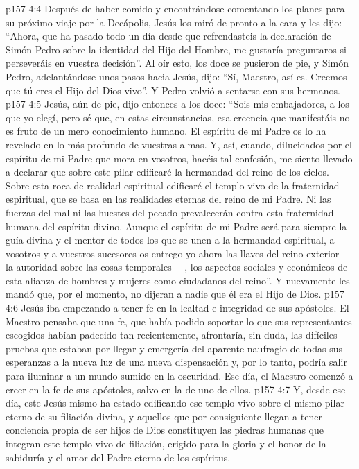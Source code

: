 \vs p157 4:4 Después de haber comido y encontrándose comentando los planes para su próximo viaje por la Decápolis, Jesús los miró de pronto a la cara y les dijo: “Ahora, que ha pasado todo un día desde que refrendasteis la declaración de Simón Pedro sobre la identidad del Hijo del Hombre, me gustaría preguntaros si perseveráis en vuestra decisión”. Al oír esto, los doce se pusieron de pie, y Simón Pedro, adelantándose unos pasos hacia Jesús, dijo: “Sí, Maestro, así es. Creemos que tú eres el Hijo del Dios vivo”. Y Pedro volvió a sentarse con sus hermanos.
\vs p157 4:5 Jesús, aún de pie, dijo entonces a los doce: “Sois mis embajadores, a los que yo elegí, pero sé que, en estas circunstancias, esa creencia que manifestáis no es fruto de un mero conocimiento humano. El espíritu de mi Padre os lo ha revelado en lo más profundo de vuestras almas. Y, así, cuando, dilucidados por el espíritu de mi Padre que mora en vosotros, hacéis tal confesión, me siento llevado a declarar que sobre este pilar edificaré la hermandad del reino de los cielos. Sobre esta roca de realidad espiritual edificaré el templo vivo de la fraternidad espiritual, que se basa en las realidades eternas del reino de mi Padre. Ni las fuerzas del mal ni las huestes del pecado prevalecerán contra esta fraternidad humana del espíritu divino. Aunque el espíritu de mi Padre será para siempre la guía divina y el mentor de todos los que se unen a la hermandad espiritual, a vosotros y a vuestros sucesores os entrego yo ahora las llaves del reino exterior ---la autoridad sobre las cosas temporales ---, los aspectos sociales y económicos de esta alianza de hombres y mujeres como ciudadanos del reino”. Y nuevamente les mandó que, por el momento, no dijeran a nadie que él era el Hijo de Dios.
\vs p157 4:6 \pc Jesús iba empezando a tener fe en la lealtad e integridad de sus apóstoles. El Maestro pensaba que una fe, que había podido soportar lo que sus representantes escogidos habían padecido tan recientemente, afrontaría, sin duda, las difíciles pruebas que estaban por llegar y emergería del aparente naufragio de todas sus esperanzas a la nueva luz de una nueva dispensación y, por lo tanto, podría salir para iluminar a un mundo sumido en la oscuridad. Ese día, el Maestro comenzó a creer en la fe de sus apóstoles, salvo en la de uno de ellos.
\vs p157 4:7 Y, desde ese día, este Jesús mismo ha estado edificando ese templo vivo sobre el mismo pilar eterno de su filiación divina, y aquellos que por consiguiente llegan a tener conciencia propia de ser hijos de Dios constituyen las piedras humanas que integran este templo vivo de filiación, erigido para la gloria y el honor de la sabiduría y el amor del Padre eterno de los espíritus.
